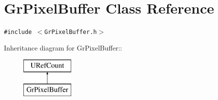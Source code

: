 \hypertarget{class_gr_pixel_buffer}{
\section{GrPixelBuffer Class Reference}
\label{class_gr_pixel_buffer}
}
{\tt \#include $<$GrPixelBuffer.h$>$}

Inheritance diagram for GrPixelBuffer::\begin{figure}[H]
\begin{center}
\leavevmode
\includegraphics[height=2cm]{class_gr_pixel_buffer}
\end{center}
\end{figure}
